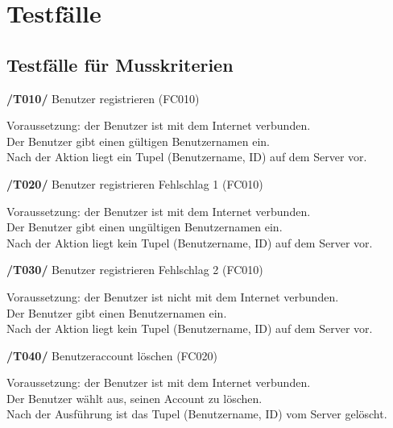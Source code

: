 \section{Testfälle}
\subsection{Testfälle für Musskriterien}
\textbf{/T010/} Benutzer registrieren (FC010) \\
\begin{itemize}
Voraussetzung: der Benutzer ist mit dem Internet verbunden.\\
Der Benutzer gibt einen gültigen Benutzernamen ein.\\
Nach der Aktion liegt ein Tupel (Benutzername, ID) auf dem Server vor.\\
\end{itemize}

\textbf{/T020/} Benutzer registrieren Fehlschlag 1 (FC010) \\
\begin{itemize}
Voraussetzung: der Benutzer ist mit dem Internet verbunden.            \\
Der Benutzer gibt einen ungültigen Benutzernamen ein.                   \\
Nach der Aktion liegt kein Tupel (Benutzername, ID) auf dem Server vor.  \\
\end{itemize}

\textbf{/T030/} Benutzer registrieren Fehlschlag 2 (FC010) \\
\begin{itemize}
Voraussetzung: der Benutzer ist nicht mit dem Internet verbunden.         \\
Der Benutzer gibt einen Benutzernamen ein.                                 \\
Nach der Aktion liegt kein Tupel (Benutzername, ID) auf dem Server vor.     \\
\end{itemize}

\textbf{/T040/} Benutzeraccount löschen (FC020) \\
\begin{itemize}
Voraussetzung: der Benutzer ist mit dem Internet verbunden.               \\
Der Benutzer wählt aus, seinen Account zu löschen.                         \\
Nach der Ausführung ist das Tupel (Benutzername, ID) vom Server gelöscht.   \\
\end{itemize}

